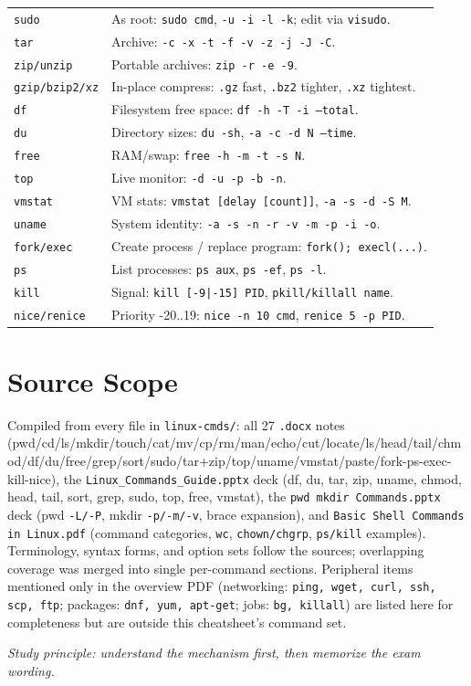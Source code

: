 \documentclass[11pt,a4paper]{article}
\newcommand{\cmd}[1]{\texttt{#1}}
\begin{document}
\begin{center}
\begin{longtable}{ll}
\cmd{sudo} & As root: \cmd{sudo cmd}, \cmd{-u -i -l -k}; edit via \cmd{visudo}. \\
\cmd{tar} & Archive: \cmd{-c -x -t -f -v -z -j -J -C}. \\
\cmd{zip/unzip} & Portable archives: \cmd{zip -r -e -9}. \\
\cmd{gzip/bzip2/xz} & In-place compress: \cmd{.gz} fast, \cmd{.bz2} tighter, \cmd{.xz} tightest. \\
\cmd{df} & Filesystem free space: \cmd{df -h -T -i --total}. \\
\cmd{du} & Directory sizes: \cmd{du -sh}, \cmd{-a -c -d N --time}. \\
\cmd{free} & RAM/swap: \cmd{free -h -m -t -s N}. \\
\cmd{top} & Live monitor: \cmd{-d -u -p -b -n}. \\
\cmd{vmstat} & VM stats: \cmd{vmstat [delay [count]]}, \cmd{-a -s -d -S M}. \\
\cmd{uname} & System identity: \cmd{-a -s -n -r -v -m -p -i -o}. \\
\cmd{fork/exec} & Create process / replace program: \cmd{fork(); execl(...)}. \\
\cmd{ps} & List processes: \cmd{ps aux}, \cmd{ps -ef}, \cmd{ps -l}. \\
\cmd{kill} & Signal: \cmd{kill [-9|-15] PID}, \cmd{pkill/killall name}. \\
\cmd{nice/renice} & Priority -20..19: \cmd{nice -n 10 cmd}, \cmd{renice 5 -p PID}. \\
\end{longtable}
\end{center}

\section*{Source Scope}
Compiled from every file in \cmd{linux-cmds/}: all 27 \cmd{.docx} notes (pwd/cd/ls/mkdir/touch/cat/mv/cp/rm/man/echo/cut/locate/ls/head/tail/chmod/df/du/free/grep/sort/sudo/tar+zip/top/uname/vmstat/paste/fork-ps-exec-kill-nice), the \cmd{Linux\_Commands\_Guide.pptx} deck (df, du, tar, zip, uname, chmod, head, tail, sort, grep, sudo, top, free, vmstat), the \cmd{pwd mkdir Commands.pptx} deck (pwd \cmd{-L/-P}, mkdir \cmd{-p/-m/-v}, brace expansion), and \cmd{Basic Shell Commands in Linux.pdf} (command categories, \cmd{wc}, \cmd{chown/chgrp}, \cmd{ps/kill} examples). Terminology, syntax forms, and option sets follow the sources; overlapping coverage was merged into single per-command sections. Peripheral items mentioned only in the overview PDF (networking: \cmd{ping, wget, curl, ssh, scp, ftp}; packages: \cmd{dnf, yum, apt-get}; jobs: \cmd{bg, killall}) are listed here for completeness but are outside this cheatsheet's command set.

\vfill
\begin{center}
\textit{Study principle: understand the mechanism first, then memorize the exam wording.}
\end{center}
\end{document}
